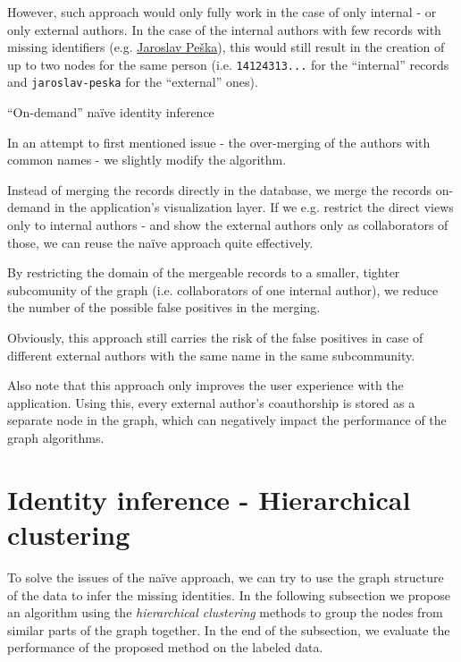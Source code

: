 However, such approach would only fully work in the case of only internal - or only external authors.
In the case of the internal authors with few records with missing identifiers (e.g. \hyperref[fig:jaroslav-peska]{Jaroslav Peška}),
this would still result in the creation of up to two nodes for the same person (i.e. \texttt{14124313...} for the ``internal'' records and \texttt{jaroslav-peska} for the ``external'' ones).

\label{sec:on-demand-identity-inference}
\begin{mybox}{``On-demand'' naïve identity inference}

In an attempt to first mentioned issue - the over-merging of the authors with common names - we slightly modify the algorithm.

Instead of merging the records directly in the database, we merge the records on-demand in the application's visualization layer.
If we e.g. restrict the direct views only to internal authors - and show the external authors only as collaborators of those,
we can reuse the naïve approach quite effectively.

By restricting the domain of the mergeable records to a smaller, tighter subcomunity of the graph (i.e. collaborators of one internal author), 
we reduce the number of the possible false positives in the merging.

Obviously, this approach still carries the risk of the false positives in case of different external authors with the same name in the same subcommunity.

Also note that this approach only improves the user experience with the application.
Using this, every external author's coauthorship is stored as a separate node in the graph, which can negatively impact the performance of the graph algorithms.
\end{mybox}

\section{Identity inference - Hierarchical clustering}

To solve the issues of the naïve approach, we can try to use the graph structure of the data to infer the missing identities.
In the following subsection we propose an algorithm using the \textit{hierarchical clustering} methods to group the nodes from similar parts of the graph together.
In the end of the subsection, we evaluate the performance of the proposed method on the labeled data.

